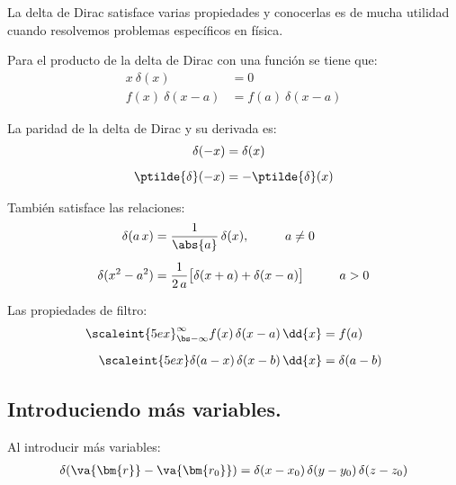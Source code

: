 La delta de Dirac satisface varias propiedades y conocerlas es de mucha utilidad cuando resolvemos problemas específicos en física. 
\par

\begin{propiedad}
Para el producto de la delta de Dirac con una función se tiene que:
\begin{align}
x \: \delta(x) &= 0 \\[0.5em]
f(x) \: \delta(x - a) &= f(a) \: \delta(x - a)
\end{align}
\end{propiedad}

\begin{propiedad}
La paridad de la delta de Dirac y su derivada es:
\begin{align}
\delta (-x) &= \delta (x) \\[0.5em]
\ptilde{\delta} (-x) &= - \ptilde{\delta} (x)
\end{align}

\end{propiedad}

\begin{propiedad}
También satisface las relaciones:
\begin{align}
\delta(a \, x) &= \dfrac{1}{\abs{a}} \, \delta (x), \hspace{1cm} a \neq 0 \\[0.5em]
\delta (x^{2} - a^{2}) &= \dfrac{1}{2 \, a} \big[ \delta (x + a) + \delta (x - a) \big] \hspace{1cm} a > 0
\end{align}
\end{propiedad}

\begin{propiedad}
Las propiedades de filtro:
\begin{align}
\scaleint{5ex}_{\bs -\infty}^{\infty} f(x) \, \delta (x - a) \, \dd{x} &= f(a) \\[0.5em]
\scaleint{5ex} \delta (a - x) \, \delta (x - b) \, \dd{x} &= \delta (a - b)
\end{align}

\end{propiedad}

\subsection{Introduciendo más variables.}

Al introducir más variables:
\begin{align}
\delta (\va{\bm{r}} - \va{\bm{r_{0}}}) = \delta (x - x_{0}) \, \delta (y - y_{0}) \, \delta (z - z_{0})
\label{eq:ecuacion_A_03}
\end{align}

